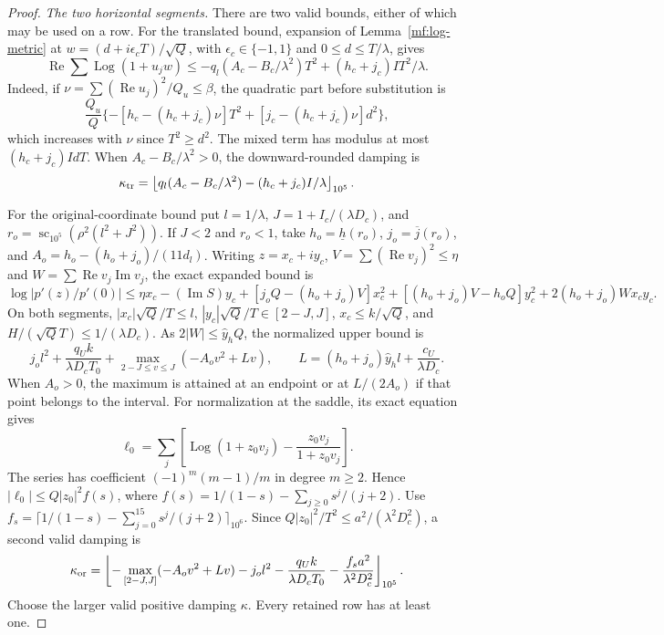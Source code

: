 \documentclass[11pt,reqno]{amsart}
\numberwithin{equation}{section}
\theoremstyle{definition}
\theoremstyle{remark}
\renewcommand{\Re}{\operatorname{Re}}
\renewcommand{\Im}{\operatorname{Im}}
\DeclareMathOperator{\Log}{Log}
\begin{document}
\begin{proof}
\smallskip
\noindent\emph{The two horizontal segments.}
There are two valid bounds, either of which may be used on a row.
For the translated bound, expansion of Lemma~\ref{mf:log-metric}
at $w=(d+i\epsilon_c T)/\sqrt Q$, with
$\epsilon_c\in\{-1,1\}$ and $0\le d\le T/\lambda$, gives
\[
 \Re\sum\Log(1+u_jw)
 \le-q_l(A_c-B_c/\lambda^2)T^2
           +(h_c+j_c)IT^2/\lambda.
\]
Indeed, if $\nu=\sum(\Re u_j)^2/Q_u\le\beta$, the quadratic
part before substitution is
\[
 \frac{Q_u}{Q}\{-[h_c-(h_c+j_c)\nu]T^2
                  +[j_c-(h_c+j_c)\nu]d^2\},
\]
which increases with $\nu$ since $T^2\ge d^2$.
The mixed term has modulus at most $(h_c+j_c)IdT$.
When $A_c-B_c/\lambda^2>0$, the downward-rounded damping is
\[
 \kappa_{\rm tr}=
 \left\lfloor q_l(A_c-B_c/\lambda^2)
                  -(h_c+j_c)I/\lambda\right\rfloor_{10^5}.
\]

For the original-coordinate bound put
$l=1/\lambda$, $J=1+I_c/(\lambda D_c)$, and
$r_o=\operatorname{sc}_{10^5}(\rho^2(l^2+J^2))$.
If $J<2$ and $r_o<1$, take $h_o=\underline h(r_o)$,
$j_o=\overline j(r_o)$, and
$A_o=h_o-(h_o+j_o)/(11d_l)$.
Writing $z=x_c+iy_c$, $V=\sum(\Re v_j)^2\le\eta$ and
$W=\sum\Re v_j\Im v_j$, the exact expanded bound is
\[
 \log|p'(z)/p'(0)|
 \le\eta x_c-(\Im S)y_c
 +[j_oQ-(h_o+j_o)V]x_c^2
 +[(h_o+j_o)V-h_oQ]y_c^2+2(h_o+j_o)Wx_cy_c.
\]
On both segments,
$|x_c|\sqrt Q/T\le l$,
$|y_c|\sqrt Q/T\in[2-J,J]$,
$x_c\le k/\sqrt Q$, and $H/(\sqrt Q T)\le1/(\lambda D_c)$.
As $2|W|\le\widehat y_hQ$, the normalized upper bound is
\[
 j_ol^2+\frac{q_Uk}{\lambda D_cT_0}
 +\max_{2-J\le v\le J}(-A_ov^2+Lv),\qquad
 L=(h_o+j_o)\widehat y_hl+\frac{c_U}{\lambda D_c}.
\]
When $A_o>0$, the maximum is attained at an endpoint or at
$L/(2A_o)$ if that point belongs to the interval.
For normalization at the saddle, its exact equation gives
\[
 \ell_0=\sum_j\left[\Log(1+z_0v_j)
                      -\frac{z_0v_j}{1+z_0v_j}\right].
\]
The series has coefficient $(-1)^m(m-1)/m$ in degree
$m\ge2$. Hence $|\ell_0|\le Q|z_0|^2f(s)$, where
$f(s)=1/(1-s)-\sum_{j\ge0}s^j/(j+2)$.
Use
$f_s=\lceil1/(1-s)-\sum_{j=0}^{15}s^j/(j+2)\rceil_{10^6}$.
Since $Q|z_0|^2/T^2\le a^2/(\lambda^2D_c^2)$, a second
valid damping is
\[
 \kappa_{\rm or}=\left\lfloor
 -\max_{[2-J,J]}(-A_ov^2+Lv)-j_ol^2
 -\frac{q_Uk}{\lambda D_cT_0}
 -\frac{f_sa^2}{\lambda^2D_c^2}\right\rfloor_{10^5}.
\]
Choose the larger valid positive damping $\kappa$.
Every retained row has at least one.


\end{proof}
\end{document}

